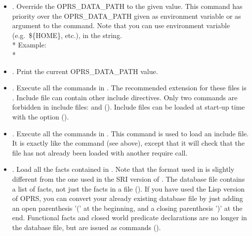 \begin{itemize}

\item {}. Override the OPRS\_DATA\_PATH to the given
value. This command has priority over the OPRS\_DATA\_PATH given as environment
variable or as argument to the  command. Note that you can use environment variable (e.g.\ \$\{HOME\}, etc.),  in the string.\\*
Example: \\*


\item {}. Print the current OPRS\_DATA\_PATH value.

\item {}. Execute all the commands in
. The recommended extension for these files is .
Include file can contain other include directives. Only two commands are
forbidden in include files:  and 
(). Include files can be loaded at start-up time with the  option
().

\item {}. Execute all the commands in .
This command is used to load an include file. It is exactly like the
 command (see above), except that it will check that
the file has not already been loaded with another require call.

\item {}. Load all the facts contained in
. Note that the format used in \COPRSDE{} is slightly different
from the one used in the SRI version of \OPRS{}. The database file contains a list of facts,
not just the facts in a file (). If you have used
the Lisp version of OPRS, you can convert your already existing database file by
just adding an open parenthesis '(' at the beginning, and a closing parenthesis
')' at the end. Functional facts and closed world predicate declarations are no
longer in the database file, but are issued as commands ().


\end{itemize}
